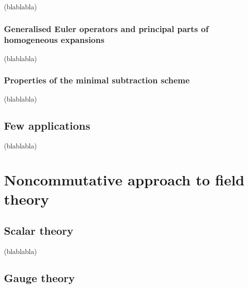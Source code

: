 \documentclass[11pt]{book}
\begin{document}
(blablabla)

\section{Generalised Euler operators and principal parts of homogeneous expansions}

(blablabla)

\section{Properties of the minimal subtraction scheme}

(blablabla)

\chapter{Few applications}

(blablabla)

\part{Noncommutative approach to field theory}

\chapter{Scalar theory}

(blablabla)

\chapter{Gauge theory}
\end{document}
